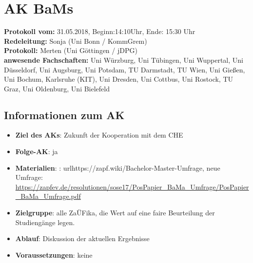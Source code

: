 
\section{AK BaMs}

	\textbf{Protokoll vom:} 31.05.2018,
	Beginn:14:10Uhr,
	Ende: 15:30 Uhr \\
	\textbf{Redeleitung:} Sonja (Uni Bonn / KommGrem) \\
	\textbf{Protokoll:} Merten (Uni Göttingen / jDPG) \\
	\textbf{anwesende Fachschaften:} Uni Würzburg, Uni Tübingen, Uni Wuppertal, Uni Düsseldorf, Uni Augsburg, Uni Potsdam, TU Darmstadt, TU Wien, Uni Gießen, Uni Bochum, Karlsruhe (KIT), Uni Dresden, Uni Cottbus, Uni Rostock, TU Graz, Uni Oldenburg, Uni Bielefeld

	\subsection*{Informationen zum AK}
		\begin{itemize}
			\item \textbf{Ziel des AKs}: Zukunft der Kooperation mit dem CHE
			\item \textbf{Folge-AK}: ja
      \item \textbf{Materialien}: \allgemein: url{https://zapf.wiki/Bachelor-Master-Umfrage}, neue Umfrage: \url{https://zapfev.de/resolutionen/sose17/PosPapier_BaMa_Umfrage/PosPapier_BaMa_Umfrage.pdf}
			\item \textbf{Zielgruppe}: alle ZaÜFika, die Wert auf eine faire Beurteilung der Studiengänge legen.
			\item \textbf{Ablauf}: Diskussion der aktuellen Ergebnisse
			\item \textbf{Voraussetzungen}: keine
		\end{itemize}

